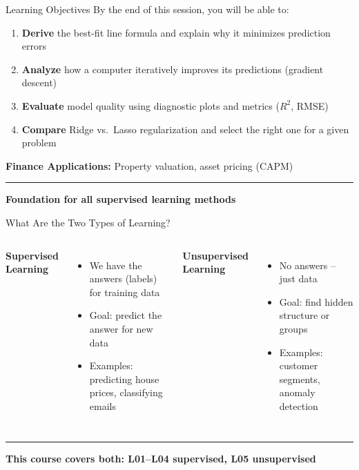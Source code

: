 \documentclass[8pt,aspectratio=169]{beamer}
\newcommand{\bottomnote}[1]{%
\vfill
\vspace{-2mm}
\textcolor{mllavender2}{\rule{\textwidth}{0.4pt}}
\vspace{1mm}
\footnotesize
\textbf{#1}
}
\begin{document}
\begin{frame}[t]{Learning Objectives}
  By the end of this session, you will be able to:

  \begin{enumerate}
    \item \textbf{Derive} the best-fit line formula and explain why it minimizes prediction errors
    \item \textbf{Analyze} how a computer iteratively improves its predictions (gradient descent)
    \item \textbf{Evaluate} model quality using diagnostic plots and metrics ($R^2$, RMSE)
    \item \textbf{Compare} Ridge vs.\ Lasso regularization and select the right one for a given problem
  \end{enumerate}

  \vspace{0.5em}
  \textbf{Finance Applications:} Property valuation, asset pricing (CAPM)

  \bottomnote{Foundation for all supervised learning methods}
\end{frame}

\begin{frame}[t]{What Are the Two Types of Learning?}
\begin{columns}[T]
\textbf{Supervised Learning}

\begin{itemize}
  \item We have the answers (labels) for training data
  \item Goal: predict the answer for new data
  \item Examples: predicting house prices, classifying emails
\end{itemize}

\textbf{Unsupervised Learning}

\begin{itemize}
  \item No answers -- just data
  \item Goal: find hidden structure or groups
  \item Examples: customer segments, anomaly detection
\end{itemize}
\end{columns}

\bottomnote{This course covers both: L01--L04 supervised, L05 unsupervised}
\end{frame}
\end{document}
